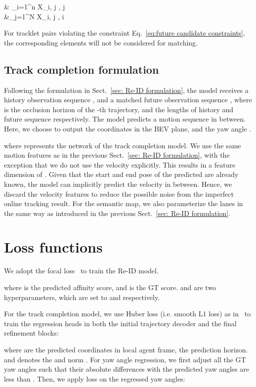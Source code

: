 \documentclass{article} \usepackage{iclr2023_conference,times}
\begin{document}
 & \sum_{i=1}^n X_{i, j} , \forall j  \\
    &\sum_{j=1}^N X_{i, j} , \forall i


For tracklet pairs violating the constraint Eq.~\ref{eq:future candidate constraints}, the corresponding elements will not be considered for matching.

\subsection{Track completion formulation}
\label{sec: Track completion formulation}
Following the formulation in Sect.~\ref{sec: Re-ID formulation}, the model receives a history observation sequence , and a matched future observation sequence  , where  is the occlusion horizon of the -th trajectory,  and  the lengths of history and future sequence respectively. The model predicts a motion sequence  in between. Here, we choose to output the  coordinates in the BEV plane, and the yaw angle . 

where  represents the network of the track completion model. We use the same motion features as in the previous Sect.~\ref{sec: Re-ID formulation}, with the exception that we do not use the velocity explicitly. This results in a feature dimension of . Given that the start and end pose of the predicted are already known, the model can implicitly predict the velocity in between. Hence, we discard the velocity features to reduce the possible noise from the imperfect online tracking result. For the semantic map, we also parameterize the lanes in the same way as introduced in the previous Sect.~\ref{sec: Re-ID formulation}. 

\section{Loss functions} 
\label{sec: loss formulas}
We adopt the focal loss~\cite{focal_loss} to train the Re-ID model.


where  is the predicted affinity score, and  is the GT score.  and  are two hyperparameters, which are set to  and  respectively. 

For the track completion model, we use Huber loss (i.e. smooth L1 loss) as in~\cite{DCMS,laneGCN,gu2021densetnt} to train the  regression heads in both the initial trajectory decoder and the final refinement blocks: 

where  are the predicted  coordinates in local agent frame,  the prediction horizon.  and  denotes the  and  norm . For yaw angle regression, we first adjust all the GT yaw angles such that their absolute differences with the predicted yaw angles are less than . Then, we apply  loss on the regressed yaw angles:
\end{document}
